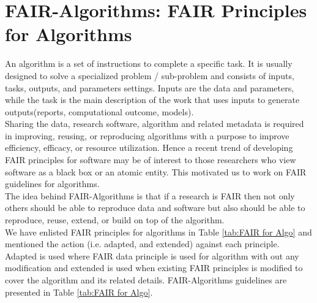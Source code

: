 \documentclass[preprint,12pt]{elsarticle}
\begin{document}
\section{FAIR-Algorithms: FAIR Principles for Algorithms} \label{sec:FAIR Principles}
An algorithm is a set of instructions to complete a specific task.
It is usually designed to solve a specialized problem
/ sub-problem and consists of inputs, tasks, outputs, and parameters settings. Inputs are the data and parameters, while the task is the main description of the work that uses inputs to generate outputs(reports, computational outcome, models).\\ 
Sharing the data, research software, algorithm and related metadata is required in improving, reusing, or reproducing algorithms with a purpose to improve efficiency, efficacy, or resource utilization. Hence a recent trend of developing FAIR principles for software may be of interest to those researchers who view software as a black box or an atomic entity. This motivated us to work on FAIR guidelines for algorithms. \\
The idea behind FAIR-Algorithms is that if a research is FAIR then not only others should be able to reproduce data and software but also should be able to reproduce, reuse, extend, or build on top of the algorithm. \\
We have enlisted FAIR principles for algorithms in Table \ref{tab:FAIR for Algo} and mentioned the action (i.e. adapted, and extended) against each principle. Adapted is used where FAIR data principle is used for algorithm with out any modification and extended is used when existing FAIR principles is modified to cover the algorithm and its related details. FAIR-Algorithms guidelines are presented in Table \ref{tab:FAIR for Algo}.\\

\end{document}
